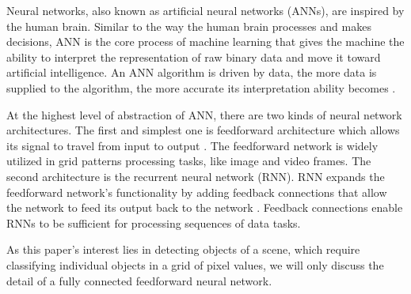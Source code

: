 Neural networks, also known as artificial neural networks (ANNs), are inspired by the human brain. Similar to the way the human brain processes and makes decisions, ANN is the core process of machine learning that gives the machine the ability to interpret the representation of raw binary data and move it toward artificial intelligence. An ANN algorithm is driven by data, the more data is supplied to the algorithm, the more accurate its interpretation ability becomes \cite{ai_data_driven}.

At the highest level of abstraction of ANN, there are two kinds of neural network architectures. The first and simplest one is feedforward architecture which allows its signal to travel from input to output \cite{lecun2015deep}. The feedforward network is widely utilized in grid patterns processing tasks, like image and video frames. The second architecture is the recurrent neural network (RNN). RNN expands the feedforward network's functionality by adding feedback connections that allow the network to feed its output back to the network \cite{lecun2015deep}. Feedback connections enable RNNs to be sufficient for processing sequences of data tasks.

As this paper's interest lies in detecting objects of a scene, which require classifying individual objects in a grid of pixel values, we will only discuss the detail of a fully connected feedforward neural network.





